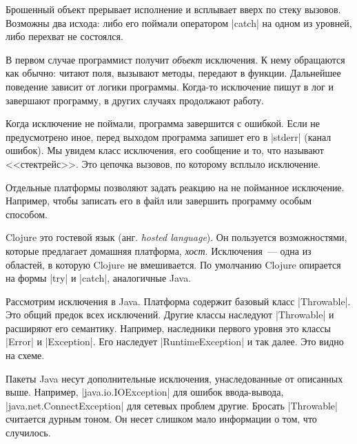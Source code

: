 Брошенный объект прерывает исполнение и всплывает вверх по стеку
вызовов. Возможны два исхода: либо его поймали оператором \spverb|catch| на
одном из уровней, либо перехват не состоялся.

В первом случае программист получит \emph{объект} исключения. К нему обращаются
как обычно: читают поля, вызывают методы, передают в функции. Дальнейшее
поведение зависит от логики программы. Когда-то исключение пишут в лог и
завершают программу, в других случаях продолжают работу.

Когда исключение не поймали, программа завершится с ошибкой. Если не
предусмотрено иное, перед выходом программа запишет его в \spverb|stderr| (канал
ошибок). Мы увидем класс исключения, его сообщение и то, что называют
<<стектрейс>>. Это цепочка вызовов, по которому всплыло исключение.

Отдельные платформы позволяют задать реакцию на не пойманное
исключение. Например, чтобы записать его в файл или завершить программу особым
способом.

Clojure это гостевой язык (анг. \emph{hosted language}). Он пользуется
возможностями, которые предлагает домашняя платформа, \emph{хост}.
Исключения~--- одна из областей, в которую Clojure не вмешивается.
По умолчанию Clojure опирается на формы \spverb|try| и \spverb|catch|,
аналогичные Java.

Рассмотрим исключения в Java. Платформа содержит базовый класс
\spverb|Throwable|. Это общий предок всех исключений. Другие классы наследуют
\spverb|Throwable| и расширяют его семантику. Например, наследники первого
уровня это классы \spverb|Error| и \spverb|Exception|. Его наследует
\spverb|RuntimeException| и так далее. Это видно на схеме.


Пакеты Java несут дополнительные исключения, унаследованные от описанных
выше. Например, \spverb|java.io.IOException| для ошибок ввода-вывода,
\spverb|java.net.ConnectException| для сетевых проблем другие. Бросать
\spverb|Throwable| считается дурным тоном. Он несет слишком мало информации о
том, что случилось.

